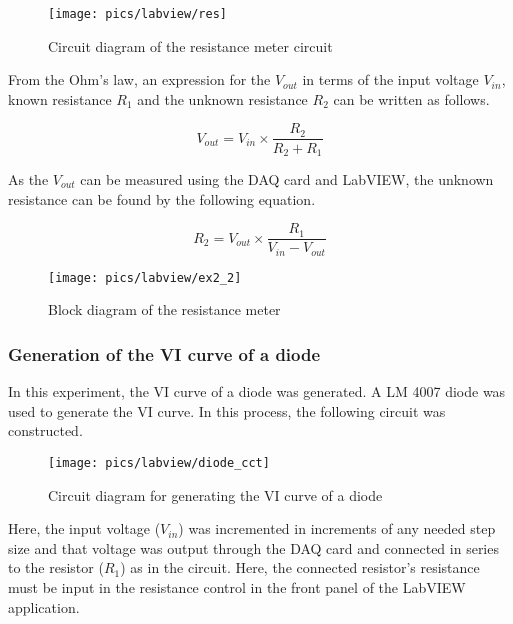 \begin{figure}[!h]
	\centering
	\texttt{[image: pics/labview/res]}
	\caption{Circuit diagram of the resistance meter circuit}
	\label{fig:ex101}
\end{figure}

\noindent
From the Ohm's law, an expression for the $V_{out}$ in terms of the input voltage $V_{in}$, known resistance $R_{1}$ and the unknown resistance $R_{2}$  can be written as follows.

\begin{equation}
V_{out}= V_{in} \times \frac{R_{2}}{R_{2}+R_{1}}
\end{equation}

\noindent
As the $V_{out}$ can be measured using the DAQ card and LabVIEW, the unknown resistance can be found by the following equation.

\begin{equation}
R_{2}=V_{out} \times \dfrac{R_{1}}{V_{in}-V_{out}}
\end{equation}

\begin{figure}[!h]
	\centering
	\texttt{[image: pics/labview/ex2\_2]}
	\caption{Block diagram of the resistance meter}
	\label{fig:ex11}
\end{figure}

\subsubsection{Generation of the VI curve of a diode}

In this experiment, the VI curve of a diode was generated.  A LM 4007 diode was used to generate the VI curve. In this process, the following circuit was constructed.

\begin{figure}[!h]
	\centering
	\texttt{[image: pics/labview/diode\_cct]}
	\caption{Circuit diagram for generating the VI curve of a diode}
	\label{fig:ex12}
\end{figure}

\noindent
Here, the input voltage ($V _{in} $) was incremented in increments of any needed step size and that voltage was output through the DAQ card and connected in series to the resistor ($R _{1} $) as in the circuit. Here, the connected resistor's resistance must be input in the resistance control in the front panel of the LabVIEW application. \\

